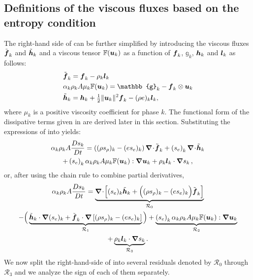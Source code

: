 \subsection{Definitions of the viscous fluxes based on the entropy condition}
%
The right-hand side of  can be further simplified by introducing the viscous fluxes $\tilde{\boldsymbol f}_k$ and 
$\tilde{\boldsymbol h}_k$ and a viscous tensor $\mathbb{F}(\boldsymbol u_k)$ as a function of $\boldsymbol f_k$, 
$\mathbb{g}_k$, $\boldsymbol h_k$ and $\boldsymbol l_k$ as follows:
%
\begin{subequations}\label{eq:def-diss-terms-sect4}
\begin{align}
& \tilde{\mbold f}_k   =   \mbold f_k - \rho_k \mbold  l_k
  \\
&  \alpha_k \rho_k A \mu_k \mathbb{F}(\mbold u_k) =  \mathbb{g}_k -  \mbold f_k \otimes \mbold u_k
  \\
&  \tilde{\mbold h}_k =   \mbold h_k + \tfrac{1}{2}\| \mbold u_k\|^2  \mbold f_k - (\rho e)_k \mbold l_k,
\end{align}
\end{subequations}
%
where $\mu_k$ is a positive viscosity coefficient for phase $k$. The functional form of the dissipative terms given in 
 are derived later in this section. Substituting the expressions of  
into  yields:
%
\begin{multline}\label{eq:ent-res-7-eqn-diss-terms_rearranged2}
\alpha_k \rho_k A \frac{Ds_k}{Dt} 
=  \left( (\rho s_\rho)_k - (e s_e)_k \right) \boldsymbol\nabla\! \cdot \! \tilde{\boldsymbol f}_k 
+ \left(s_e\right)_k \boldsymbol\nabla\! \cdot \! \tilde{ \boldsymbol h} _k \\
+ \left(s_e\right)_k \alpha_k \rho_k A \mu_k \mathbb{F}(\boldsymbol u_k) : \boldsymbol\nabla \boldsymbol u_k 
+ \rho_k \boldsymbol l _k \cdot \boldsymbol\nabla s_k \,,
\end{multline}
%
or, after using the chain rule to combine partial derivatives,
%
\begin{multline}\label{eq:ent-res-7-eqn-diss-terms2}
\alpha_k \rho_k A \frac{Ds_k}{Dt} = 
\underbrace{\boldsymbol\nabla\! \cdot \! \left[ (s_e)_k\tilde{\boldsymbol h}_k +\Big( (\rho s_\rho)_k - (e s_e)_k \Big) \tilde{\boldsymbol f}_k \right]}_{{\mathcal{R}_0}} \\
-\Big(
\underbrace{\tilde{\boldsymbol h}_k \cdot \boldsymbol\nabla (s_e)_k + \tilde{\boldsymbol f}_k \cdot \boldsymbol\nabla \left[  (\rho s_\rho)_k - (e s_e)_k \right]}_{\mathcal{R}_1} 
\Big)
+ \underbrace{ \left(s_e\right)_k \alpha_k \rho_k A \mu_k \mathbb{F}(\boldsymbol u_k) : \boldsymbol\nabla \boldsymbol u_k}_{\mathcal{R}_2} \\
+ \underbrace{\rho_k \boldsymbol l _k \cdot \boldsymbol\nabla s_k}_{\mathcal{R}_3}.
\end{multline}
%
We now split the right-hand-side of  into several residuals denoted by $\mathcal{R}_0$ 
through $\mathcal{R}_3$ and we analyze the sign of each of them separately. 

